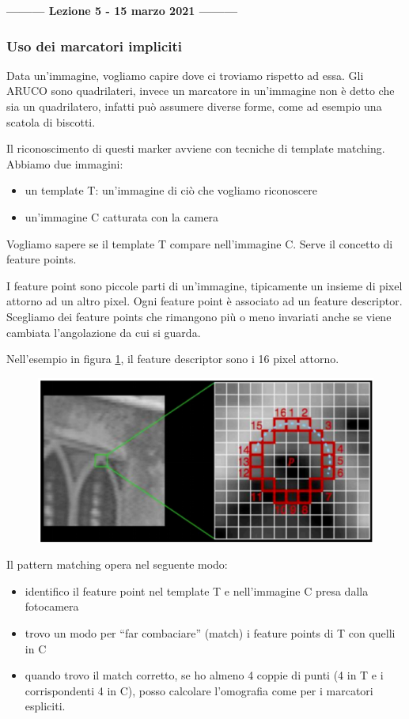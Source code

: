 \begin{center}
    \textbf{--------- Lezione 5 - 15 marzo 2021 ---------}
\end{center}

\subsubsection{Uso dei marcatori impliciti}
Data un'immagine, vogliamo capire dove ci troviamo rispetto ad essa. 
Gli ARUCO sono quadrilateri, invece un marcatore in un'immagine  non è detto che sia un quadrilatero, infatti può assumere diverse forme, come ad esempio una scatola di biscotti. 

Il riconoscimento di questi marker avviene con tecniche di template matching. 
Abbiamo due immagini: 
\begin{itemize}
    \item un template T: un'immagine di ciò che vogliamo riconoscere
    \item un'immagine C catturata con la camera
\end{itemize}
Vogliamo sapere se il template T compare nell'immagine C.
Serve il concetto di feature points.

I feature point sono piccole parti di un'immagine, tipicamente un insieme di pixel attorno ad un altro pixel. Ogni feature point è associato ad un feature descriptor. 
Scegliamo dei feature points che rimangono più o meno invariati anche se viene cambiata l'angolazione da cui si guarda.

Nell'esempio in figura \ref{fig:feature descriptor}, il feature descriptor sono i 16 pixel attorno.
\begin{figure}[!ht]
    \centering
    \includegraphics[width = .6\textwidth]{images/MobiDEV/3. augmented reality/feature points.PNG}
    \caption{}
    \label{fig:feature descriptor}
\end{figure}

Il pattern matching opera nel seguente modo: 
\begin{itemize}
    \item identifico il feature point nel template T e nell'immagine C presa dalla fotocamera
    \item trovo un modo per “far combaciare” (match) i feature points di T con quelli in C
    \item quando trovo il match corretto, se ho almeno 4 coppie di punti (4 in T e i corrispondenti 4 in C), posso calcolare l'omografia come per i marcatori espliciti. 
\end{itemize}

